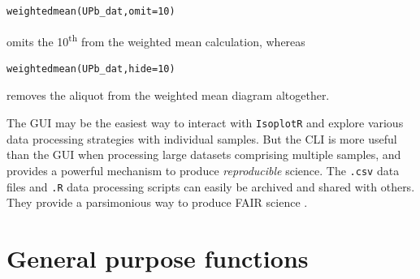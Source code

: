 \begin{refsection}
\begin{verbatim}
weightedmean(UPb_dat,omit=10)
\end{verbatim}

\noindent omits the 10\textsuperscript{th} from the weighted mean
calculation, whereas

\begin{verbatim}
weightedmean(UPb_dat,hide=10)
\end{verbatim}

\noindent removes the aliquot from the weighted mean diagram
altogether.

The GUI may be the easiest way to interact with \texttt{IsoplotR} and
explore various data processing strategies with individual
samples. But the CLI is more useful than the GUI when processing large
datasets comprising multiple samples, and provides a powerful
mechanism to produce \emph{reproducible} science. The \texttt{.csv}
data files and \texttt{.R} data processing scripts can easily be
archived and shared with others. They provide a parsimonious way to
produce FAIR science \citep{wilkinson2016}.

\section{General purpose functions}

\printbibliography[heading=subbibliography]

\end{refsection}
